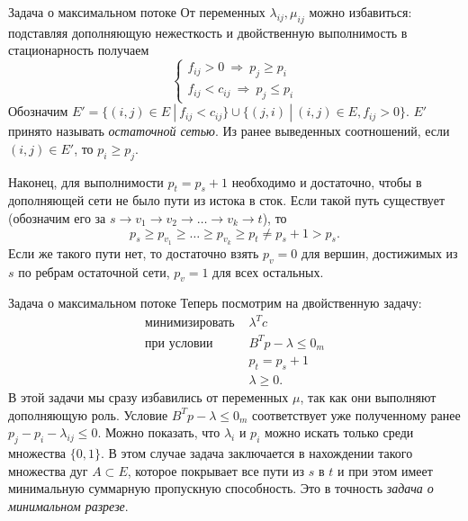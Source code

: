\documentclass[10pt]{beamer}
\begin{document}
\begin{frame}{Задача о максимальном потоке}
От переменных $\lambda_{ij}, \mu_{ij}$ можно избавиться: подставляя дополняющую нежесткость и двойственную выполнимость в  стационарность получаем
$$
\left\{\begin{array}{ll}
f_{ij}>0~\Rightarrow~p_j\geq p_i \\
f_{ij}<c_{ij}~\Rightarrow~p_j\leq p_i
\end{array}\right.
$$
Обозначим $E'=\{(i,j)\in E~|~f_{ij}<c_{ij}\}\cup\{(j, i)~|~(i,j)\in E, f_{ij}>0\}$. $E'$ принято называть \textit{остаточной сетью}. Из ранее выведенных соотношений, если $(i,j)\in E'$, то $p_i\geq p_j$. 

Наконец, для выполнимости $p_t=p_s+1$ необходимо и достаточно, чтобы в дополняющей сети не было пути из истока в сток. Если такой путь существует (обозначим его за $s\rightarrow v_1\rightarrow v_2 \rightarrow \ldots \rightarrow v_k \rightarrow t$), то 
$$
p_s\geq p_{v_1}\geq \ldots \geq p_{v_k}\geq p_t\neq p_s+1>p_s.
$$
Если же такого пути нет, то достаточно взять $p_v=0$ для вершин, достижимых из $s$ по ребрам остаточной сети, $p_v=1$ для всех остальных.
\end{frame}

\begin{frame}{Задача о максимальном потоке}
Теперь посмотрим на двойственную задачу:
$$
\begin{array}{ll}
\mbox{минимизировать } & \lambda^Tc \\
\mbox{при условии }    & B^Tp-\lambda\leq 0_m \\
 & p_t=p_s+1 \\
 & \lambda \geq 0.
\end{array}
$$
В этой задачи мы сразу избавились от переменных $\mu$, так как они выполняют дополняющую роль. Условие $B^Tp-\lambda\leq 0_m$ соответствует уже полученному ранее $p_j-p_i-\lambda_{ij}\leq 0$. Можно показать, что $\lambda_i$ и $p_i$ можно искать только среди множества $\{0,1\}$. В этом случае задача заключается в нахождении такого множества дуг $A\subset E$, которое покрывает все пути из $s$ в $t$ и при этом имеет минимальную суммарную пропускную способность. Это в точность \textit{задача о минимальном разрезе}.
\end{frame}
\end{document}
